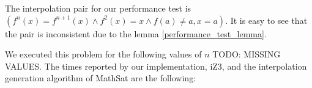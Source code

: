 The interpolation pair for our performance test 
is $(f^n(x) = f^{n+1}(x) \land f^2(x) = x \land f(a) \neq a, x = a)$.
It is easy to see that the pair is inconsistent due to the lemma 
\ref{performance_test_lemma}.

We executed this problem for the following values of $n$ TODO: MISSING
VALUES. 
The times reported by our implementation, iZ3, and the interpolation 
generation algorithm of MathSat are the following:

